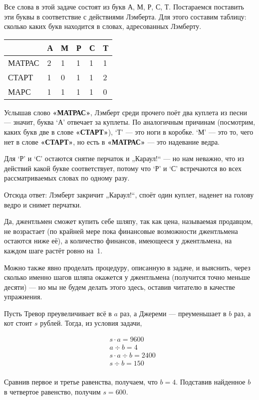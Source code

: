 
\begin{itemize}
\itA Все слова в этой задаче состоят из букв А, М, Р, С, Т. Постараемся поставить эти буквы в соответствие с действиями Лэмберта. Для этого составим таблицу: сколько каких букв находится в словах, адресованных Лэмберту.

\begin{center} \begin{tabular}{|l|l|l|l|l|l|}
\hline		& А & М & Р & С & Т \\ \hline
\ttfamily МАТРАС & 2 & 1 & 1 & 1 & 1 \\ \hline
\ttfamily СТАРТ & 1 & 0 & 1 & 1 & 2 \\ \hline
\ttfamily МАРС & 1 & 1 & 1 & 1 & 0 \\ \hline
\end{tabular} \end{center}

Услышав слово {\bfseries«МАТРАС»}, Лэмберт среди прочего поёт два куплета из песни — значит, буква `А' отвечает за куплеты. По аналогичным причинам (посмотрим, каких букв две в слове {\bfseries «СТАРТ»}), `Т' — это ноги в коробке. `М' — это то, чего нет в слове {\bfseries «СТАРТ»}, но есть в {\bfseries «МАТРАС»} — это надевание ведра.

Для `Р' и `С' остаются снятие перчаток и „Караул!“ — но нам неважно, что из действий какой букве соответствует, потому что `Р' и `С' встречаются во всех рассматриваемых словах по одному разу.

Отсюда ответ: Лэмберт закричит „Караул!“, споёт один куплет, наденет на голову ведро и снимет перчатки.

\itB Да, джентльмен сможет купить себе шляпу, так как цена, называемая продавцом, не возрастает (по крайней мере пока финансовые возможности джентльмена остаются ниже её), а количество финансов, имеющееся у джентльмена, на каждом шаге растёт ровно на~1.

Можно также явно проделать процедуру, описанную в задаче, и выяснить, через сколько именно шагов шляпа окажется у джентльмена (получится точно меньше десяти) — но мы не будем делать этого здесь, оставив читателю в качестве упражнения.

\itC Пусть Тревор преувеличивает всё в $a$ раз, а Джереми — преуменьшает в $b$ раз, а кот стоит $s$ рублей. Тогда, из условия задачи,

\begin{align*}
	& s \cdot a = 9600 \\
	& a \div b = 4 \\
	& s \cdot a \div b = 2400 \\
	& s \div b = 150 \\
\end{align*}

\vspace{-0.4cm}
Сравнив первое и третье равенства, получаем, что $b=4$. Подставив найденное $b$ в четвертое равенство, получим $s=600$.

\end{itemize}